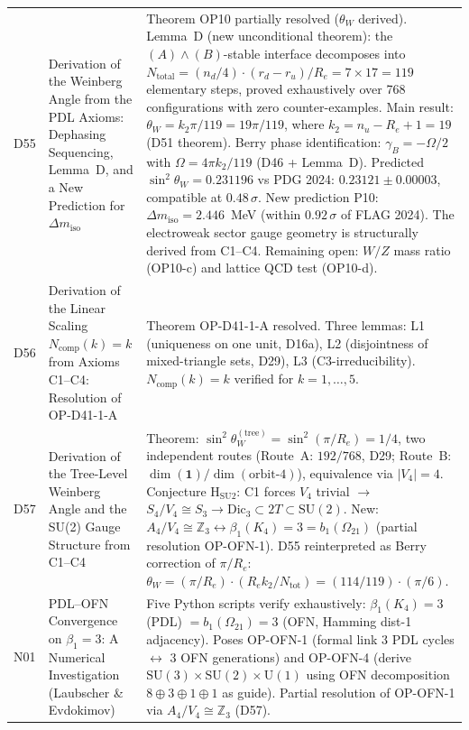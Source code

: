 \documentclass[11pt,a4paper]{article}
\theoremstyle{plain}
\theoremstyle{definition}
\theoremstyle{remark}
\newcommand{\Kfour}{K_4}
\begin{document}
\begin{longtable}{L{1.3cm}L{3.8cm}L{8.0cm}}
D55 & Derivation of the Weinberg Angle from the PDL Axioms: Dephasing Sequencing, Lemma~D, and a New Prediction for $\Delta m_{\mathrm{iso}}$~\cite{D55} & \textcolor{proofblue}{Theorem} OP10 partially resolved ($\theta_W$ derived). Lemma~D (new unconditional theorem): the $(A)\wedge(B)$-stable interface decomposes into $N_{\mathrm{total}} = (n_d/4)\cdot(r_d-r_u)/R_e = 7\times 17 = 119$ elementary steps, proved exhaustively over 768 configurations with zero counter-examples. Main result: $\theta_W = k_2\pi/119 = 19\pi/119$, where $k_2 = n_u - R_e + 1 = 19$ (D51 theorem). Berry phase identification: $\gamma_B = -\Omega/2$ with $\Omega = 4\pi k_2/119$ (D46 + Lemma~D). Predicted $\sin^2\theta_W = 0.231196$ vs PDG 2024: $0.23121 \pm 0.00003$, compatible at $0.48\,\sigma$. New prediction P10: $\Delta m_{\mathrm{iso}} = 2.446$~MeV (within $0.92\,\sigma$ of FLAG 2024). The electroweak sector gauge geometry is structurally derived from C1--C4. Remaining open: $W/Z$ mass ratio (OP10-c) and lattice QCD test (OP10-d).\\[0.4em]
D56 & Derivation of the Linear Scaling $N_{\mathrm{comp}}(k)=k$ from Axioms C1--C4: Resolution of OP-D41-1-A~\cite{D56} & \textcolor{proofblue}{Theorem} OP-D41-1-A resolved. Three lemmas: L1 (uniqueness on one unit, D16a), L2 (disjointness of mixed-triangle sets, D29), L3 (C3-irreducibility). $N_{\mathrm{comp}}(k)=k$ verified for $k=1,\ldots,5$.\\[0.4em]
D57 & Derivation of the Tree-Level Weinberg Angle and the SU(2) Gauge Structure from C1--C4~\cite{D57} & \textcolor{proofblue}{Theorem}: $\sin^2\theta_W^{(\mathrm{tree})} = \sin^2(\pi/R_e) = 1/4$, two independent routes (Route~A: $192/768$, D29; Route~B: $\dim(\mathbf{1})/\dim(\text{orbit-4})$), equivalence via $|V_4|=4$. \textcolor{conjecturegreen}{Conjecture} H$_{\mathrm{SU2}}$: C1 forces $V_4$ trivial $\to$ $S_4/V_4 \cong S_3 \to \mathrm{Dic}_3 \subset 2T \subset \mathrm{SU}(2)$. New: $A_4/V_4 \cong \mathbb{Z}_3 \leftrightarrow \beta_1(\Kfour)=3=b_1(\Omega_{21})$ (partial resolution OP-OFN-1). D55 reinterpreted as Berry correction of $\pi/R_e$: $\theta_W = (\pi/R_e)\cdot(R_e k_2/N_{\mathrm{tot}}) = (114/119)\cdot(\pi/6)$.\\[0.4em]
N01 & PDL--OFN Convergence on $\beta_1=3$: A Numerical Investigation (Laubscher \& Evdokimov)~\cite{N01} & Five Python scripts verify exhaustively: $\beta_1(\Kfour)=3$ (PDL) $= b_1(\Omega_{21})=3$ (OFN, Hamming dist-1 adjacency). Poses OP-OFN-1 (formal link 3 PDL cycles $\leftrightarrow$ 3 OFN generations) and OP-OFN-4 (derive $\mathrm{SU}(3)\times\mathrm{SU}(2)\times\mathrm{U}(1)$ using OFN decomposition $8\oplus3\oplus1\oplus1$ as guide). Partial resolution of OP-OFN-1 via $A_4/V_4 \cong \mathbb{Z}_3$ (D57).\\[0.4em]

\end{longtable}
\end{document}
